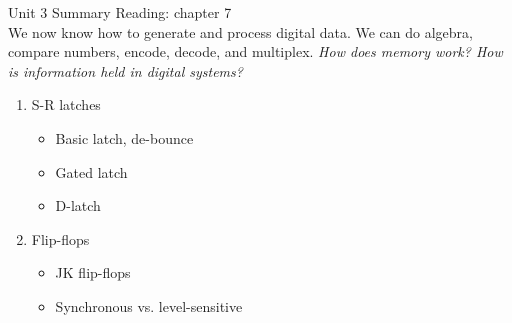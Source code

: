 \documentclass{beamer}
\begin{document}
\begin{frame}{Unit 3 Summary}
\alert{Reading: chapter 7} \\
We now know how to generate and process digital data. We can do algebra, compare numbers, encode, decode, and multiplex.  \textit{How does memory work?  How is information held in digital systems?}
\begin{enumerate}
\item S-R latches
\begin{itemize}
\item Basic latch, de-bounce
\item Gated latch
\item D-latch
\end{itemize}
\item Flip-flops
\begin{itemize}
\item JK flip-flops
\item Synchronous vs. level-sensitive
\end{itemize}
\end{enumerate}
\end{frame}
\end{document}
